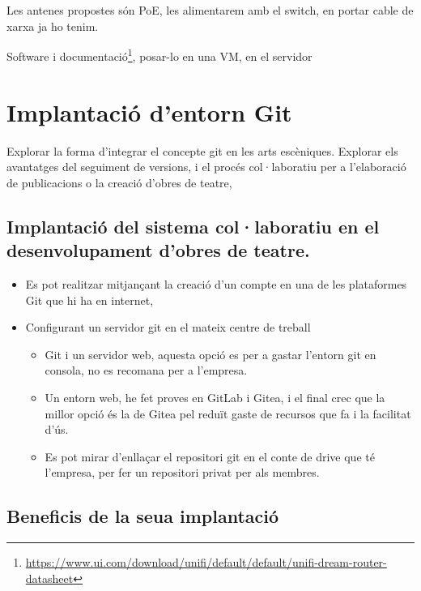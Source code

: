 \documentclass[
  10pt,
]{krantz}
\DeclareRobustCommand{\href}[2]{#2\footnote{\url{#1}}}
\providecommand{\tightlist}{%
  \setlength{\itemsep}{0pt}\setlength{\parskip}{0pt}}
\begin{document}
Les antenes propostes són PoE, les alimentarem amb el switch, en portar cable de xarxa ja ho tenim.

\href{https://www.ui.com/download/unifi/default/default/unifi-dream-router-datasheet}{Software i documentació}, posar-lo en una VM, en el servidor

\hypertarget{implantaciuxf3-dentorn-git}{%
\chapter{Implantació d'entorn Git}\label{implantaciuxf3-dentorn-git}}

Explorar la forma d'integrar el concepte git en les arts escèniques. Explorar els avantatges del seguiment de versions, i el procés col·laboratiu per a l'elaboració de publicacions o la creació d'obres de teatre,

\hypertarget{implantaciuxf3-del-sistema-collaboratiu-en-el-desenvolupament-dobres-de-teatre.}{%
\section{Implantació del sistema col·laboratiu en el desenvolupament d'obres de teatre.}\label{implantaciuxf3-del-sistema-collaboratiu-en-el-desenvolupament-dobres-de-teatre.}}

\begin{itemize}
\tightlist
\item
  Es pot realitzar mitjançant la creació d'un compte en una de les plataformes Git que hi ha en internet,
\item
  Configurant un servidor git en el mateix centre de treball

  \begin{itemize}
  \tightlist
  \item
    Git i un servidor web, aquesta opció es per a gastar l'entorn git en consola, no es recomana per a l'empresa.
  \item
    Un entorn web, he fet proves en GitLab i Gitea, i el final crec que la millor opció és la de Gitea pel reduït gaste de recursos que fa i la facilitat d'ús.
  \item
    Es pot mirar d'enllaçar el repositori git en el conte de drive que té l'empresa, per fer un repositori privat per als membres.
  \end{itemize}
\end{itemize}

\hypertarget{beneficis-de-la-seua-implantaciuxf3}{%
\section{Beneficis de la seua implantació}\label{beneficis-de-la-seua-implantaciuxf3}}
\end{document}
